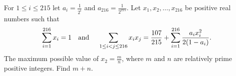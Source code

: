 For $1\leq i\leq 215$ let $a_i=\frac{1}{2^i}$ and $a_{216}=\frac{1}{2^{215}}$. Let $x_1,x_2,\ldots,x_{216}$ be positive real numbers such that \[ \sum\limits_{i=1}^{216} x_i=1 \text{\quad and \quad} \sum\limits_{1\leq i<j \leq 216} x_ix_j = \frac{107}{215}+ \sum\limits_{i=1}^{216} \frac{a_ix_i^2}{2(1-a_i)}.\]The maximum possible value of $x_2=\frac{m}{n}$, where $m$ and $n$ are relatively prime positive integers. Find $m+n$.